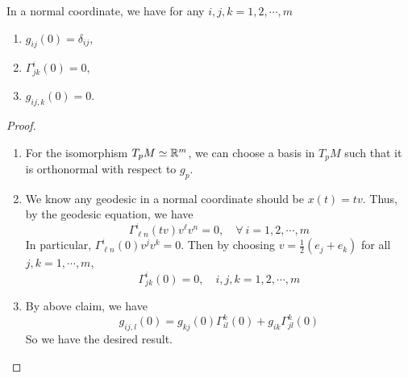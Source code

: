 \begin{thm}
	In a normal coordinate, we have for any $i,j,k =1,2,\cdots,m$
	\begin{enumerate}[label=(\arabic{*})]
		\item $g_{ij}(0) = \delta_{ij}$,
		\item $\Gamma^i_{jk}(0) = 0$,
		\item $g_{ij,k}(0) = 0$.
	\end{enumerate}
\end{thm}
\begin{proof}
	\begin{enumerate}[label=(\arabic{*})]
		\item For the isomorphism $T_pM \simeq \mathbb{R}^m$, we can choose a basis in $T_pM$ such that it is orthonormal with respect to $g_p$.
		\item We know any geodesic in a normal coordinate should be $x(t) = tv$. Thus, by the geodesic equation, we have
		\begin{equation*}
			\Gamma_{\ell n}^i(t v) v^\ell v^n=0,\quad \forall~i=1,2,\cdots,m
		\end{equation*}
		In particular, $\Gamma_{\ell n}^i(0) v^j v^k=0$. Then by choosing $v = \frac{1}{2}(e_j+e_k)$ for all $j,k=1,\cdots,m$,
		\begin{equation*}
			\Gamma_{j k}^i(0) = 0,\quad i,j,k = 1,2,\cdots,m
		\end{equation*}
		\item By above claim, we have
		\begin{equation*}
			g_{ij,l}(0)=g_{kj}(0)\Gamma^k_{il}(0)+g_{ik}\Gamma^k_{jl}(0)
		\end{equation*}
		So we have the desired result. \qedhere
	\end{enumerate}
\end{proof}

